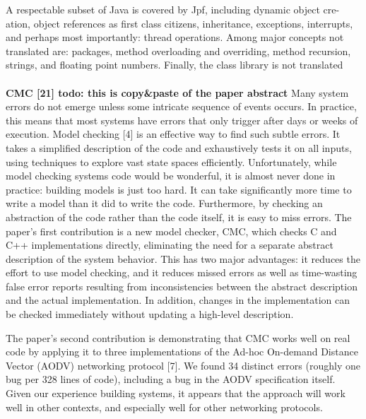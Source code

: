 A respectable subset of Java is covered by Jpf, including dynamic object cre- ation, object references as first class citizens, inheritance, exceptions, interrupts, and perhaps most importantly: thread operations. Among major concepts not translated are: packages, method overloading and overriding, method recursion, strings, and floating point numbers. Finally, the class library is not translated
\\
\\
\textbf{CMC [21] todo: this is copy\&paste of the paper abstract}
Many system errors do not emerge unless some intricate sequence of events occurs. In practice, this means that most systems have errors that only trigger after days or weeks of execution. Model checking [4] is an effective way to find such subtle errors. It takes a simplified description of the code and exhaustively tests it on all inputs, using techniques to explore vast state spaces efficiently. Unfortunately, while model checking systems code would be wonderful, it is almost never done in practice: building models is just too hard. It can take significantly more time to write a model than it did to write the code. Furthermore, by checking an abstraction of the code rather than the code itself, it is easy to miss errors.
The paper's first contribution is a new model checker, CMC, which checks C and C++ implementations directly, eliminating the need for a separate abstract description of the system behavior. This has two major advantages: it reduces the effort to use model checking, and it reduces missed errors as well as time-wasting false error reports resulting from inconsistencies between the abstract description and the actual implementation. In addition, changes in the implementation can be checked immediately without updating a high-level description.

The paper's second contribution is demonstrating that CMC works well on real code by applying it to three implementations of the Ad-hoc On-demand Distance Vector (AODV) networking protocol [7]. We found 34 distinct errors (roughly one bug per 328 lines of code), including a bug in the AODV specification itself. Given our experience building systems, it appears that the approach will work well in other contexts, and especially well for other networking protocols.
